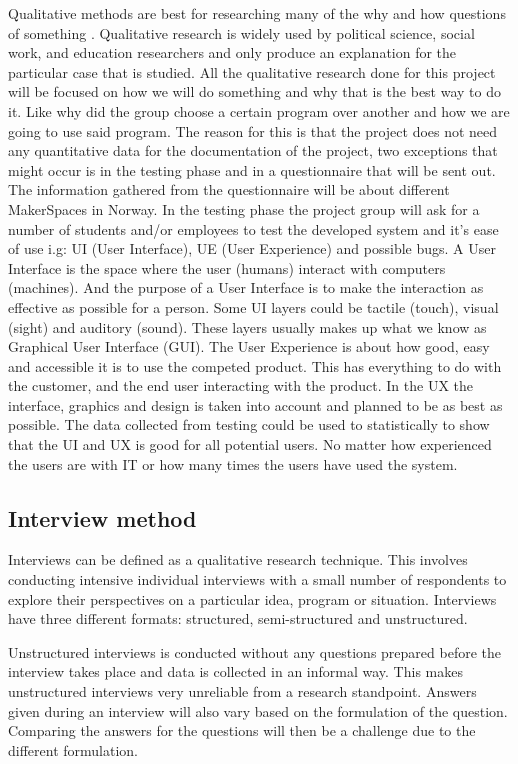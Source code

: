  Qualitative methods are best for researching many of the why and how questions of something \cite{Qualitative-Research}. Qualitative research is widely used by political science, social work, and education researchers and only produce an explanation for the particular case that is studied. All the qualitative research done for this project will be focused on how we will do something and why that is the best way to do it. Like why did the group choose a certain program over another and how we are going to use said program. The reason for this is that the project does not need any quantitative data for the documentation of the project, two exceptions that might occur is in the testing phase and in a questionnaire that will be sent out. The information gathered from the questionnaire will be about different MakerSpaces in Norway. In the testing phase the project group will ask for a number of students and/or employees to test the developed system and it's ease of use i.g: UI (User Interface), UE (User Experience) and possible bugs. A User Interface is the space where the user (humans) interact with computers (machines)\cite{user-interface}. And the purpose of a User Interface is to make the interaction as effective as possible for a person. Some UI layers could be tactile (touch), visual (sight) and auditory (sound). These layers usually makes up what we know as Graphical User Interface (GUI)\cite{GUI}. The User Experience is about how good, easy and accessible it is to use the competed product. This has everything to do with the customer, and the end user interacting with the product. In the UX the interface, graphics and design is taken into account and planned to be as best as possible\cite{UX}.  
 The data collected from testing could be used to statistically to show that the UI and UX is good for all potential users. No matter how experienced the users are with IT or how many times the users have used the system.
 \subsection{Interview method}
 
 Interviews can be defined as a qualitative research technique. This involves conducting intensive individual interviews with a small number of respondents to explore their perspectives on a particular idea, program or situation.\cite{Interview-Methods} Interviews have three different formats: structured, semi-structured and unstructured.

Unstructured interviews is conducted without any questions prepared before the interview takes place and data is collected in an informal way. This makes unstructured interviews very unreliable from a research standpoint. Answers given during an interview will also vary based on the formulation of the question. Comparing the answers for the questions will then be a challenge due to the different formulation.

